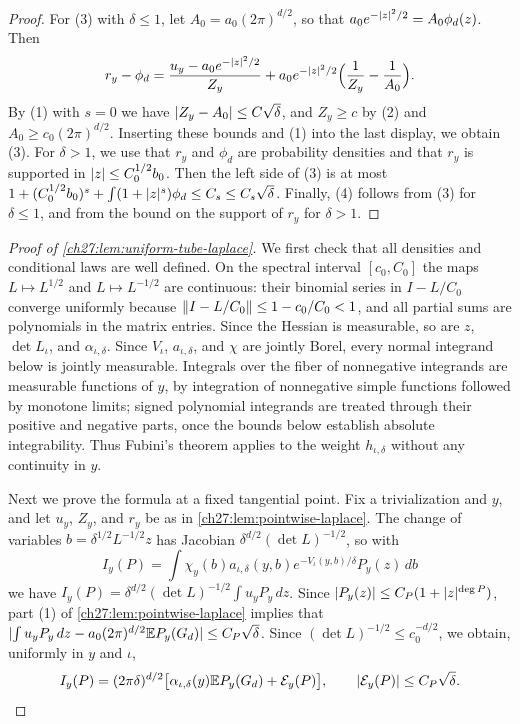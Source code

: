 \begin{proof}
For (3) with $\delta\le1$, let $A_0=a_0(2\pi)^{d/2}$, so that $a_0e^{-\lvert z\rvert^2/2}=A_0\phi_d(z)$. Then
\[
 r_y-\phi_d=\frac{u_y-a_0e^{-\lvert z\rvert^2/2}}{Z_y}+a_0e^{-\lvert z\rvert^2/2}\Bigl(\frac1{Z_y}-\frac1{A_0}\Bigr).
\]
By (1) with $s=0$ we have $\lvert Z_y-A_0\rvert\le C\sqrt\delta$, and $Z_y\ge c$ by (2) and $A_0\ge c_0(2\pi)^{d/2}$. Inserting these bounds and (1) into the last display, we obtain (3). For $\delta>1$, we use that $r_y$ and $\phi_d$ are probability densities and that $r_y$ is supported in $\lvert z\rvert\le C_0^{1/2}b_0$. Then the left side of (3) is at most $1+(C_0^{1/2}b_0)^s+\int(1+\lvert z\rvert^s)\phi_d\le C_s\le C_s\sqrt\delta$. Finally, (4) follows from (3) for $\delta\le1$, and from the bound on the support of $r_y$ for $\delta>1$.
\end{proof}

\begin{proof}[Proof of \cref{ch27:lem:uniform-tube-laplace}]
We first check that all densities and conditional laws are well defined. On the spectral interval $[c_0,C_0]$ the maps $L\mapsto L^{1/2}$ and $L\mapsto L^{-1/2}$ are continuous: their binomial series in $I-L/C_0$ converge uniformly because $\lVert I-L/C_0\rVert\le1-c_0/C_0<1$, and all partial sums are polynomials in the matrix entries. Since the Hessian is measurable, so are $z$, $\det L_\iota$, and $\alpha_{\iota,\delta}$. Since $V_\iota$, $a_{\iota,\delta}$, and $\chi$ are jointly Borel, every normal integrand below is jointly measurable. Integrals over the fiber of nonnegative integrands are measurable functions of $y$, by integration of nonnegative simple functions followed by monotone limits; signed polynomial integrands are treated through their positive and negative parts, once the bounds below establish absolute integrability. Thus Fubini's theorem applies to the weight $h_{\iota,\delta}$ without any continuity in $y$.

Next we prove the formula at a fixed tangential point. Fix a trivialization and $y$, and let $u_y$, $Z_y$, and $r_y$ be as in \cref{ch27:lem:pointwise-laplace}. The change of variables $b=\delta^{1/2}L^{-1/2}z$ has Jacobian $\delta^{d/2}(\det L)^{-1/2}$, so with
\[
 I_y(P)=\int\chi_y(b)a_{\iota,\delta}(y,b)e^{-V_\iota(y,b)/\delta}P_y(z)\,db
\]
we have $I_y(P)=\delta^{d/2}(\det L)^{-1/2}\int u_yP_y\,dz$. Since $\lvert P_y(z)\rvert\le C_P(1+\lvert z\rvert^{\deg P})$, part (1) of \cref{ch27:lem:pointwise-laplace} implies that $\lvert \int u_yP_y\,dz-a_0(2\pi)^{d/2}\mathbb E P_y(G_d)\rvert\le C_P\sqrt\delta$. Since $(\det L)^{-1/2}\le c_0^{-d/2}$, we obtain, uniformly in $y$ and $\iota$,
\begin{equation}\label{ch27:eq:pointwise-laplace}
 I_y(P)=(2\pi\delta)^{d/2}\bigl[\alpha_{\iota,\delta}(y)\mathbb E P_y(G_d)+\mathcal E_y(P)\bigr],\qquad\lvert \mathcal E_y(P)\rvert\le C_P\sqrt\delta.
\end{equation}


\end{proof}
